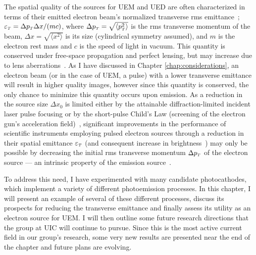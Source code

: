 

The spatial quality of the sources for UEM and UED are often characterized in terms of their emitted electron beam's normalized transverse rms emittance~\cite{dowell_quantum_2009,jensen_emittance_2010}; $\varepsilon_{{\scriptscriptstyle T}} = \Delta p_{{\scriptscriptstyle T}} \Delta x / (m c)$, where $\Delta p_{{\scriptscriptstyle T}} = \sqrt{ \langle p_{{\scriptscriptstyle T}}^2 \rangle }$ is the rms transverse momentum of the beam, $\Delta x = \sqrt{ \langle x^2 \rangle }$ is its size (cylindrical symmetry assumed), and $m$ is the electron rest mass and $c$ is the speed of light in vacuum.
This quantity is conserved under free-space propagation and perfect lensing, but may increase due to lens aberrations~\cite{oshea_reversible_1998}.
As I have discussed in Chapter \ref{chap:considerations}, an electron beam (or in the case of UEM, a pulse) with a lower transverse emittance will result in higher quality images, however since this quantity is conserved, the only chance to minimize this quantity occurs upon emission.
As a reduction in the source size $\Delta x_0$ is limited either by the attainable diffraction-limited incident laser pulse focusing or by the short-pulse Child's Law (screening of the electron gun's acceleration field)~\cite{valfells_effects_2002}, significant improvements in the performance of scientific instruments employing pulsed electron sources through a reduction in their spatial emittance $\varepsilon_{{\scriptscriptstyle T}}$ (and consequent increase in brightness~\cite{berger_dc_2009}) may only be possible by decreasing the initial rms transverse momentum $\Delta p_{{\scriptscriptstyle T}}$ of the electron source --- an intrinsic property of the emission source~\cite{dowell_quantum_2009,jensen_emittance_2010}.

To address this need, I have experimented with many candidate photocathodes, which implement a variety of different photoemission processes.
In this chapter, I will present an example of several of these different processes, discuss its prospects for reducing the transverse emittance and finally assess its utility as an electron source for UEM.
I will then outline some future research directions that the group at UIC will continue to pursue.
Since this is the most active current field in our group's research, some very new results are presented near the end of the chapter and future plans are evolving.

